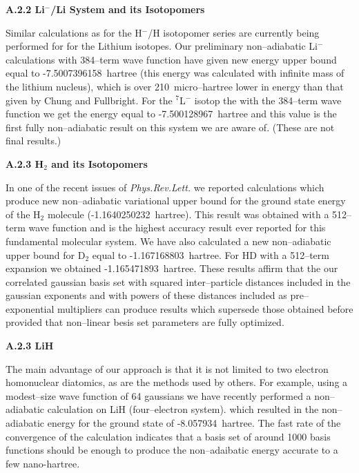 \vspace{2mm}
{\bf A.2.2 Li$^-$/Li System and its Isotopomers} 


Similar calculations as for the H$^-$/H isotopomer series
are currently being performed for  
for the Lithium isotopes.
Our preliminary non--adiabatic 
Li$^-$ calculations 
with 384--term wave function
have given new energy upper bound equal to
-7.5007396158~hartree (this energy was calculated
with infinite mass of the lithium nucleus), which is
over 210~micro--hartree lower in energy than that
given by Chung and Fullbright.\cite{Chung92} 
For the $^7$L$^-$ isotop the with the 384--term wave function
we get the energy equal to -7.500128967~hartree and this value 
is the first fully non--adiabatic result on this system we 
are aware of. (These are not final results.)


\vspace{2mm}
{\bf A.2.3 H$_2$ and its Isotopomers}

In one of the recent issues of {\em Phys.Rev.Lett.}\cite{ad1} 
we reported calculations which produce new non--adiabatic
variational upper bound for the ground state energy of
the H$_2$ molecule (-1.1640250232~hartree). This result
was obtained with a 512--term wave function and is the highest
accuracy result ever reported for this fundamental molecular system.
We have also calculated a new non--adiabatic upper bound
for D$_2$ equal to  -1.167168803~hartree.
For HD with a 512--term expansion we obtained -1.165471893~hartree.
These results affirm that the our correlated gaussian
basis set with squared inter--particle distances included in the
gaussian exponents and with powers of these distances included
as pre--exponential multipliers can produce results 
which supersede those obtained before provided that 
non--linear besis set parameters are fully optimized.

 
\vspace{2mm}
{\bf A.2.3 LiH}

The main advantage of our approach is that it is not
limited to two electron homonuclear diatomics, as are the
methods used by others. For example, using a modest--size
wave function of 64 gaussians we have recently performed
a non--adiabatic calculation on LiH (four--electron system).
which resulted in the non--adiabatic energy for the 
ground state of -8.057934~hartree.
The fast rate of the convergence of the calculation
indicates that a basis set of around 1000 basis functions
should be enough to produce the non--adaibatic energy
accurate to a few nano-hartree. 


